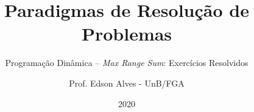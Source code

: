 \title{Paradigmas de Resolução de Problemas}
\subtitle{Programação Dinâmica -- {\it Max Range Sum}: Exercícios Resolvidos}
\author{Prof. Edson Alves - UnB/FGA}
\date{2020}
